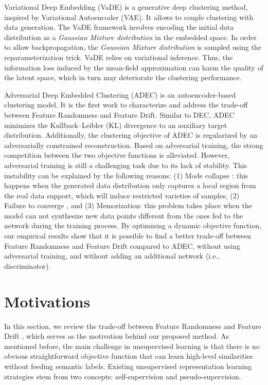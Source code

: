 \documentclass{article}
\begin{document}
Variational Deep Embedding (VaDE) \cite{paper35} is a generative deep clustering method, inspired by Variational Autoencoder (VAE). It allows to couple clustering with data generation. The VaDE framework involves encoding the initial data distribution as a \textit{Gaussian Mixture distribution} in the embedded space. In order to allow backpropagation, the \textit{Gaussian Mixture distribution} is sampled using the reparameterization trick. VaDE relies on variational inference. Thus, the information loss induced by the mean-field approximation can harm the quality of the latent space, which in turn may deteriorate the clustering performance.

Adversarial Deep Embedded Clustering (ADEC) \cite{paper98} is an autoencoder-based clustering model. It is the first work to characterize and address the trade-off between Feature Randomness and Feature Drift. Similar to DEC, ADEC minimizes the Kullback–Leibler (KL) divergence to an auxiliary target distribution. Additionally, the clustering objective of ADEC is regularized by an adversarially constrained reconstruction. Based on adversarial training, the strong competition between the two objective functions is alleviated. However, adversarial training is still a challenging task due to its lack of stability. This instability can be explained by the following reasons: (1) Mode collapse \cite{paper2}: this happens when the generated data distribution only captures a local region from the real data support, which will induce restricted varieties of samples, (2) Failure to converge \cite{paper99}, and (3) Memorization: this problem takes place when the model can not synthesize new data points different from the ones fed to the network during the training process. By optimizing a dynamic objective function, our empirical results show that it is possible to find a better trade-off between Feature Randomness and Feature Drift compared to ADEC, without using adversarial training, and without adding an additional network (i.e., discriminator).

\section{Motivations}

In this section, we review the trade-off between Feature Randomness and Feature Drift \cite{paper98}, which serves as the motivation behind our proposed method. As mentioned before, the main challenge in unsupervised learning is that there is no obvious straightforward objective function that can learn high-level similarities without feeding semantic labels. Existing unsupervised representation learning strategies stem from two concepts: self-supervision and pseudo-supervision.
\end{document}
